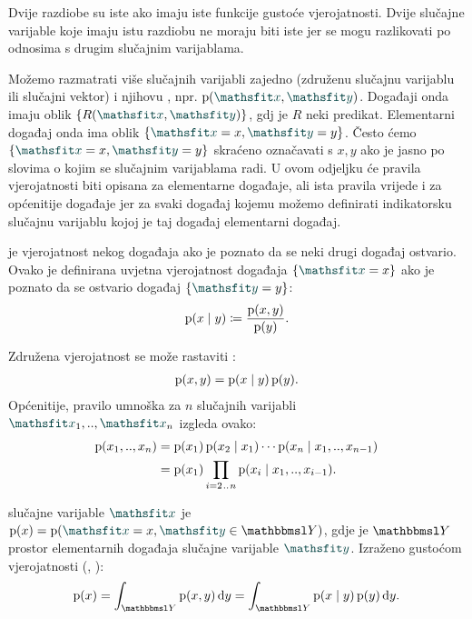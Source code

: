 \documentclass[utf8, diplomski, lmodern]{fer}
\begin{document}
Dvije razdiobe su iste ako imaju iste funkcije gustoće vjerojatnosti. Dvije slučajne varijable koje imaju istu razdiobu ne moraju biti iste jer se mogu razlikovati po odnosima s drugim slučajnim varijablama.

Možemo razmatrati više slučajnih varijabli zajedno (združenu slučajnu varijablu ili slučajni vektor) i njihovu , npr. $\p(\rvar x,\rvar y)$. Događaji onda imaju oblik $\cbr{R(\rvar x,\rvar y)}$, gdj je $R$ neki predikat. Elementarni događaj onda ima oblik $\cbr{\rvar x=x, \rvar y=y}$. Često ćemo $\cbr{\rvar x=x, \rvar y=y}$ skraćeno označavati s $x, y$ ako je jasno po slovima o kojim se slučajnim varijablama radi. U ovom odjeljku će pravila vjerojatnosti biti opisana za elementarne događaje, ali ista pravila vrijede i za općenitije događaje jer za svaki događaj kojemu možemo definirati indikatorsku slučajnu varijablu kojoj je taj događaj elementarni događaj.

 je vjerojatnost nekog događaja ako je poznato da se neki drugi događaj ostvario. Ovako je definirana uvjetna vjerojatnost događaja $\cbr{\rvar x=x}$ ako je poznato da se ostvario događaj $\cbr{\rvar y=y}$:
\begin{align} \label{eq:uvjetna-vj}
\operatorname*{\mathrm{p}}(x\mid y) \coloneqq \frac{\operatorname*{\mathrm{p}}(x,y)}{\operatorname*{\mathrm{p}}(y)}  \text{.}
\end{align}

Združena vjerojatnost se može rastaviti : 
\begin{align}  \label{eq:pravilo-umnoska-bin}
\operatorname*{\mathrm{p}}(x,y) = \operatorname*{\mathrm{p}}(x\mid y)\operatorname*{\mathrm{p}}(y) \text{.}
\end{align}
Općenitije, pravilo umnoška za $n$ slučajnih varijabli $\rvar x_1,..,\rvar x_n$ izgleda ovako:
\begin{align} \label{eq:pravilo-umnoska}
\operatorname*{\mathrm{p}}(x_1,..,x_n) 
&=\operatorname*{\mathrm{p}}(x_1)\operatorname*{\mathrm{p}}(x_2\mid x_1)\cdots\operatorname*{\mathrm{p}}(x_n\mid x_1,..,x_{n-1})  \\
&=\operatorname*{\mathrm{p}}(x_1)\prod_{i=2\mkern1.5mu{..}\mkern1.5mu n}\operatorname*{\mathrm{p}}(x_i\mid x_1,..,x_{i-1})  \text{.}
\end{align}

 slučajne varijable $\rvar x$ je $\p(x)=\p(\rvar x=x,\rvar y\in\set Y)$, gdje je $\set Y$ prostor elementarnih događaja slučajne varijable $\rvar y$. Izraženo gustoćom vjerojatnosti (, ):
\begin{align}
\p(x) = \int_{\set Y}\p(x,y)\dif y = \int_{\set Y}\p(x\mid y)\p(y)\dif y \text{.}
\end{align}
\end{document}
